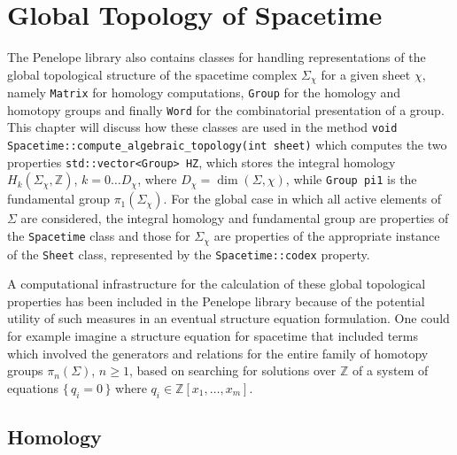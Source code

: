 \documentclass[12pt,letterpaper]{report}
\begin{document}
\chapter{Global Topology of Spacetime}

The Penelope library also contains classes for handling representations of the global topological 
structure of the spacetime complex $\Sigma_\chi$ for a given sheet $\chi$, namely \texttt{Matrix} for 
homology computations, \texttt{Group} for the homology and homotopy groups and finally \texttt{Word} 
for the combinatorial presentation of a group. This chapter will discuss how these classes are used 
in the method\newline
\texttt{void Spacetime::compute\_algebraic\_topology(int sheet)}  
\newline
which computes the two properties \texttt{std::vector<Group> HZ}, which stores the integral homology 
$H_k(\Sigma_\chi,\mathbb{Z})$, $k=0\dots D_\chi$, where $D_\chi = \dim(\Sigma,\chi)$, while \texttt{Group pi1} 
is the fundamental group $\pi_1(\Sigma_\chi)$. For the global case in which all active elements of 
$\Sigma$ are considered, the integral homology and fundamental group are properties of the \texttt{Spacetime} 
class and those for $\Sigma_\chi$ are properties of the appropriate instance of the \texttt{Sheet} class, 
represented by the \texttt{Spacetime::codex} property. 

A computational infrastructure for the calculation of these global topological properties has been 
included in the Penelope library because of the potential utility of such measures in an eventual 
structure equation formulation. One could for example imagine a structure equation for spacetime that 
included terms which involved the generators and relations for the entire family of homotopy groups 
$\pi_n(\Sigma)$, $n\ge 1$, based on searching for solutions over $\mathbb{Z}$ of a system of equations 
$\{\, q_i = 0\,\}$ where $q_i \in \mathbb{Z}[x_1,\dots,x_m]$.  

\section{Homology}
\end{document}

